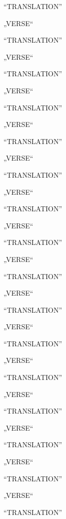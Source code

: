 \bvb “TRANSLATION”\evb
\evg


\bva „VERSE“\eva

\bvb “TRANSLATION”\evb
\evg


\bva „VERSE“\eva

\bvb “TRANSLATION”\evb
\evg


\bva „VERSE“\eva

\bvb “TRANSLATION”\evb
\evg


\bva „VERSE“\eva

\bvb “TRANSLATION”\evb
\evg


\bva „VERSE“\eva

\bvb “TRANSLATION”\evb
\evg


\bva „VERSE“\eva

\bvb “TRANSLATION”\evb
\evg


\bva „VERSE“\eva

\bvb “TRANSLATION”\evb
\evg


\bva „VERSE“\eva

\bvb “TRANSLATION”\evb
\evg


\bva „VERSE“\eva

\bvb “TRANSLATION”\evb
\evg


\bva „VERSE“\eva

\bvb “TRANSLATION”\evb
\evg


\bva „VERSE“\eva

\bvb “TRANSLATION”\evb
\evg


\bva „VERSE“\eva

\bvb “TRANSLATION”\evb
\evg


\bva „VERSE“\eva

\bvb “TRANSLATION”\evb
\evg


\bva „VERSE“\eva

\bvb “TRANSLATION”\evb
\evg


\bva „VERSE“\eva

\bvb “TRANSLATION”\evb
\evg
